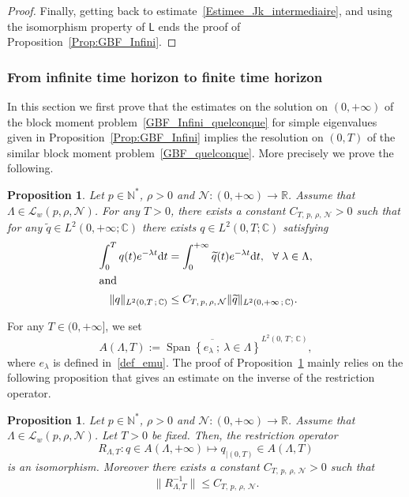 \documentclass[11pt]{article}
\newtheorem{prop}[theo]{Proposition}
\theoremstyle{definition}
\numberwithin{equation}{section}
\numberwithin{figure}{section}
\numberwithin{table}{section}
\newcommand{\LL}{\mathcal{L}}
\newcommand{\NN}{\mathcal{N}}
\newcommand{\N}{\mathbb{N}}
\newcommand{\R}{\mathbb{R}}
\newcommand{\C}{\mathbb{C}}
\newcommand{\md}{\mathrm{d}}
\DeclareMathOperator{\Span}{Span}
\let\oldforall\forall
\renewcommand*{\forall}{\mathrel{\oldforall}}
\begin{document}
\begin{proof}
Finally, getting back to estimate~\eqref{Estimee_Jk_intermediaire}, and using the isomorphism property of $\mathsf{L}$ ends the proof of Proposition~\ref{Prop:GBF_Infini}.
\end{proof}



\subsubsection{From infinite time horizon to finite time horizon}\label{Sec:BBM_finite}

In this section we first prove that the estimates on the solution on $(0,+\infty)$ of the block moment problem~\eqref{GBF_Infini_quelconque} for simple eigenvalues given in Proposition~\ref{Prop:GBF_Infini} implies the resolution on $(0,T)$ of the similar block moment problem~\eqref{GBF_quelconque}. More precisely we prove the following.

\begin{prop}\label{Prop:GBF_Infini->GBF_fini}
Let $p \in \N^*$, $ \rho > 0$ and $\NN : (0,+\infty) \to \R$. Assume that $\Lambda \in \LL_w(p,\rho, \NN)$. For any $T>0$, there exists a constant $C_{T,\,p,\,\rho,\,\NN}>0$ such that for any $\widetilde{q} \in L^2(0,+\infty ; \C)$ there exists $q \in L^2(0,T ; \C)$ satisfying
\begin{align*}
\int_0^T q(t) e^{- \lambda t} \md t &= \int_0^{+\infty} \widetilde{q}(t) e^{-\lambda t} \md t, \ \ \forall \lambda\in \Lambda,\label{GBF:Restriction_egalite}\\
\intertext{and}
\| q \|_{L^2(0,T\,;\,\C) } &\leq C_{T,\,p,\,\rho,\, \NN} \| \widetilde{q} \|_{L^2(0,+\infty\,;\, \C)}.
\end{align*}
\end{prop}
For any $T \in (0, +\infty]$, we set
\[
A(\Lambda,T) := \overline{ \Span \left\{ e_\lambda \: ; \: \lambda\in \Lambda\right\}}^{L^2(0,\,T\,;\,\C)},
\]
where $e_\lambda$ is defined in~\eqref{def_emu}. The proof of Proposition~\ref{Prop:GBF_Infini->GBF_fini} mainly relies on the following proposition that gives an estimate on the inverse of the restriction operator.

\begin{prop}\label{Prop:Restriction}
Let $p \in \N^*$, $\rho > 0$ and $\NN : (0,+\infty) \to \R$. Assume that $\Lambda \in \LL_w(p,\rho, \NN)$. Let $T>0$ be fixed. Then, the restriction operator
\begin{equation}\label{OperateurRestriction}
R_{\Lambda,T} : q \in A(\Lambda,+\infty) \mapsto q_{|(0,T)} \in A(\Lambda,T)
\end{equation}
is an isomorphism. Moreover there exists a constant $C_{T,\,p,\,\rho,\,\NN}>0$ such that
\begin{equation}\label{Estimee_Operateur_Restriction}
\| R_{\Lambda,T}^{-1} \| \leq C_{T,\,p,\,\rho,\,\NN}.
\end{equation}
\end{prop}
\end{document}
